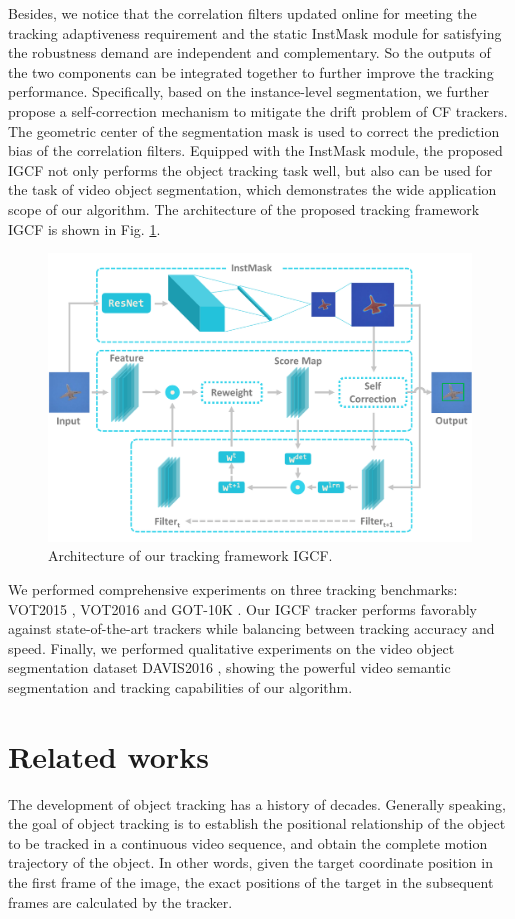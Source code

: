 \documentclass[review]{elsarticle}
\newcommand{\HL}[1]{\textcolor[rgb]{1.00,0.00,0.00}{#1}}
\begin{document}
\begin{CJK*}{UTF8}{gbsn}
Besides, we notice that the correlation filters updated online for meeting the tracking adaptiveness requirement and the static InstMask module for satisfying the robustness demand are independent and complementary. So the outputs of the two components can be integrated together to further improve the tracking performance. Specifically, based on the instance-level segmentation, we further propose a self-correction mechanism to mitigate the drift problem of CF trackers. The geometric center of the segmentation mask is used to correct the prediction bias of the correlation filters. Equipped with the InstMask module, the proposed IGCF not only performs the object tracking task well, but also can be used for the task of video object segmentation, which demonstrates the wide application scope of our algorithm. The architecture of the proposed tracking framework IGCF is shown in Fig. \ref{fig:IGCF}.

\begin{figure}
    \centering
    \includegraphics[width=12cm]{images/instmask1.pdf}
    \caption{Architecture of our tracking framework IGCF.}
    \label{fig:IGCF}
\end{figure}

We performed comprehensive experiments on three tracking benchmarks: VOT2015 \cite{Kristan2015TheVO}, VOT2016 \cite{Kristan2016TheVO} and GOT-10K \cite{Huang2018GOT10kAL}. Our IGCF tracker performs favorably against state-of-the-art trackers while balancing between tracking accuracy and speed. Finally, we performed qualitative experiments on the video object segmentation dataset DAVIS2016 \cite{Perazzi2016}, showing the powerful video semantic segmentation and tracking capabilities of our algorithm.

\section{Related works}
The development of object tracking has a history of decades. Generally speaking, the goal of object tracking is to establish the positional relationship of the object to be tracked in a continuous video sequence, and obtain the complete motion trajectory of the object. In other words, given the target coordinate position \HL{in} the first frame of the image, the exact positions of the target in the subsequent frames are calculated by the tracker. 


\end{CJK*}
\end{document}
